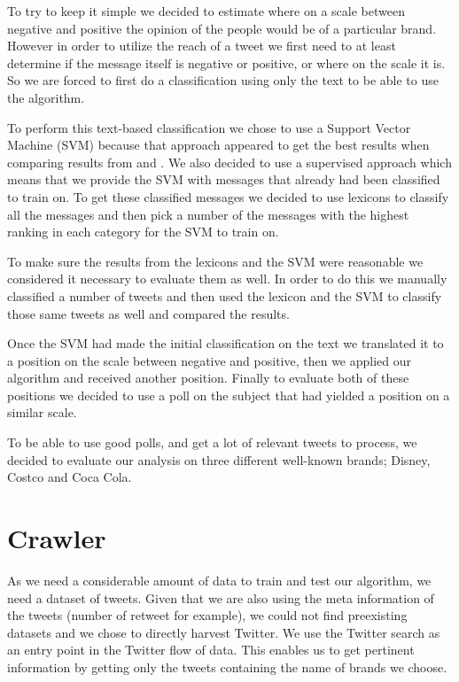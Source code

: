 \documentclass[a4paper,12pt]{report}
\begin{document}
To try to keep it simple we decided to estimate where on a scale between negative and positive the opinion of the people would be of a particular brand.
However in order to utilize the reach of a tweet we first need to at least determine if the message itself is negative or positive, or where on the scale it is.
So we are forced to first do a classification using only the text to be able to use the algorithm.

To perform this text-based classification we chose to use a Support Vector Machine (SVM) because that approach appeared to get the best results when comparing results from \cite{Pang02} and \cite{Turney02}.
We also decided to use a supervised approach which means that we provide the SVM with messages that already had been classified to train on.
To get these classified messages we decided to use lexicons to classify all the messages and then pick a number of the messages with the highest ranking in each category for the SVM to train on.

To make sure the results from the lexicons and the SVM were reasonable we considered it necessary to evaluate them as well. 
In order to do this we manually classified a number of tweets and then used the lexicon and the SVM to classify those same tweets as well and compared the results.

Once the SVM had made the initial classification on the text we translated it to a position on the scale between negative and positive, then we applied our algorithm and received another position. Finally to evaluate both of these positions we decided to use a poll on the subject that had yielded a position on a similar scale.

To be able to use good polls, and get a lot of relevant tweets to process, we decided to evaluate our analysis on three different well-known brands; Disney, Costco and Coca Cola.

\section{Crawler}

As we need a considerable amount of data to train and test our algorithm, we need a dataset of tweets. Given that we are also using the meta information of the tweets (number of retweet for example), we could not find preexisting datasets and we chose to directly harvest Twitter.
We use the Twitter search as an entry point in the Twitter flow of data. This enables us to get pertinent information by getting only the tweets containing the name of brands we choose.
\end{document}

